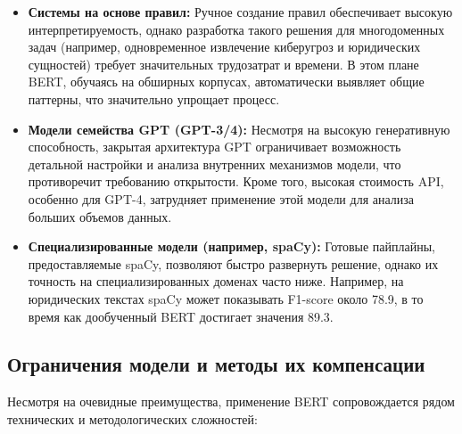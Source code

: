 \begin{itemize}
    \item \textbf{Системы на основе правил:}  
    Ручное создание правил обеспечивает высокую интерпретируемость, однако разработка такого решения для многодоменных задач (например, одновременное извлечение киберугроз и юридических сущностей) требует значительных трудозатрат и времени. В этом плане BERT, обучаясь на обширных корпусах, автоматически выявляет общие паттерны, что значительно упрощает процесс.

    \item \textbf{Модели семейства GPT (GPT-3/4):}  
    Несмотря на высокую генеративную способность, закрытая архитектура GPT ограничивает возможность детальной настройки и анализа внутренних механизмов модели, что противоречит требованию открытости. Кроме того, высокая стоимость API, особенно для GPT-4, затрудняет применение этой модели для анализа больших объемов данных.

    \item \textbf{Специализированные модели (например, spaCy):}  
    Готовые пайплайны, предоставляемые spaCy, позволяют быстро развернуть решение, однако их точность на специализированных доменах часто ниже. Например, на юридических текстах spaCy может показывать F1-score около 78.9, в то время как дообученный BERT достигает значения 89.3.
\end{itemize}

\subsection{Ограничения модели и методы их компенсации}

Несмотря на очевидные преимущества, применение BERT сопровождается рядом технических и методологических сложностей:

